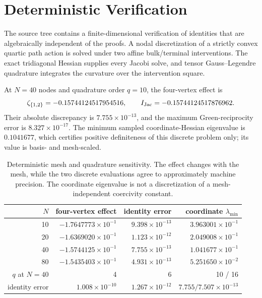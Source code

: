 \section{Deterministic Verification}
\label{sec:verification}

The source tree contains a finite-dimensional verification of identities that
are algebraically independent of the proofs.  A nodal discretization of a
strictly convex quartic path action is solved under two affine bulk/terminal
interventions.  The exact tridiagonal Hessian supplies every Jacobi solve, and
tensor Gauss--Legendre quadrature integrates the curvature over the
intervention square.

At \(N=40\) nodes and quadrature order \(q=10\), the four-vertex effect is
\[
  \zeta_{\{1,2\}}=-0.15744124517954516,
  \qquad
  I_{\rm Jac}=-0.15744124517876962.
\]
Their absolute discrepancy is
\(7.755\times10^{-13}\), and the maximum Green-reciprocity error is
\(8.327\times10^{-17}\).  The minimum sampled coordinate-Hessian eigenvalue
is \(0.1041677\), which certifies positive definiteness of this discrete
problem only; its value is basis- and mesh-scaled.

\begin{table}[t]
\caption{Deterministic mesh and quadrature sensitivity.  The effect changes
with the mesh, while the two discrete evaluations agree to approximately
machine precision.  The coordinate eigenvalue is not a discretization of a
mesh-independent coercivity constant.}
\label{tab:verification-sensitivity}
\centering
\begin{tabular}{rrrr}
\toprule
\(N\) & four-vertex effect & identity error & coordinate \(\lambda_{\min}\)\\
\midrule
10 & \(-1.7647773\times10^{-1}\) & \(9.398\times10^{-13}\) & \(3.963001\times10^{-1}\)\\
20 & \(-1.6369020\times10^{-1}\) & \(1.123\times10^{-12}\) & \(2.049008\times10^{-1}\)\\
40 & \(-1.5744125\times10^{-1}\) & \(7.755\times10^{-13}\) & \(1.041677\times10^{-1}\)\\
80 & \(-1.5435403\times10^{-1}\) & \(4.931\times10^{-13}\) & \(5.251650\times10^{-2}\)\\
\midrule
\(q\) at \(N=40\) & 4 & 6 & 10 / 16\\
identity error & \(1.008\times10^{-10}\) & \(1.267\times10^{-12}\) &
\(7.755/7.507\times10^{-13}\)\\
\bottomrule
\end{tabular}
\end{table}

